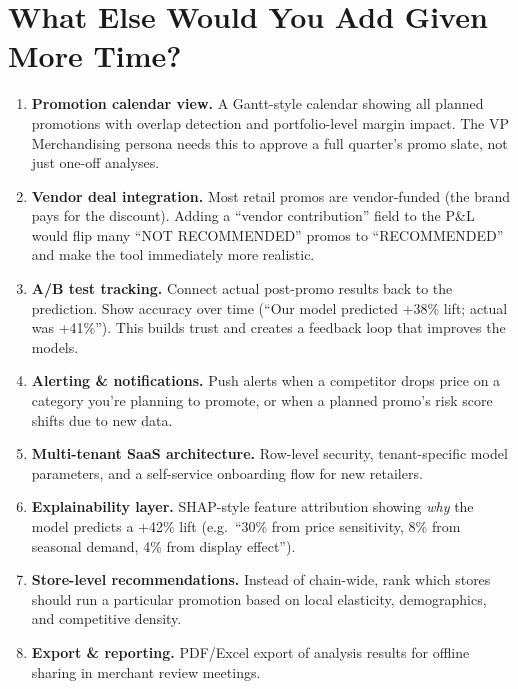 \documentclass[11pt, a4paper]{article}
\begin{document}
\section{What Else Would You Add Given More Time?}

\begin{enumerate}[leftmargin=1.5em]
    \item \textbf{Promotion calendar view.} A Gantt-style calendar showing all planned promotions with overlap detection and portfolio-level margin impact. The VP Merchandising persona needs this to approve a full quarter's promo slate, not just one-off analyses.

    \item \textbf{Vendor deal integration.} Most retail promos are vendor-funded (the brand pays for the discount). Adding a ``vendor contribution'' field to the P\&L would flip many ``NOT RECOMMENDED'' promos to ``RECOMMENDED'' and make the tool immediately more realistic.

    \item \textbf{A/B test tracking.} Connect actual post-promo results back to the prediction. Show accuracy over time (``Our model predicted +38\% lift; actual was +41\%''). This builds trust and creates a feedback loop that improves the models.

    \item \textbf{Alerting \& notifications.} Push alerts when a competitor drops price on a category you're planning to promote, or when a planned promo's risk score shifts due to new data.

    \item \textbf{Multi-tenant SaaS architecture.} Row-level security, tenant-specific model parameters, and a self-service onboarding flow for new retailers.

    \item \textbf{Explainability layer.} SHAP-style feature attribution showing \textit{why} the model predicts a +42\% lift (e.g.\ ``30\% from price sensitivity, 8\% from seasonal demand, 4\% from display effect'').

    \item \textbf{Store-level recommendations.} Instead of chain-wide, rank which stores should run a particular promotion based on local elasticity, demographics, and competitive density.

    \item \textbf{Export \& reporting.} PDF/Excel export of analysis results for offline sharing in merchant review meetings.
\end{enumerate}
\end{document}
